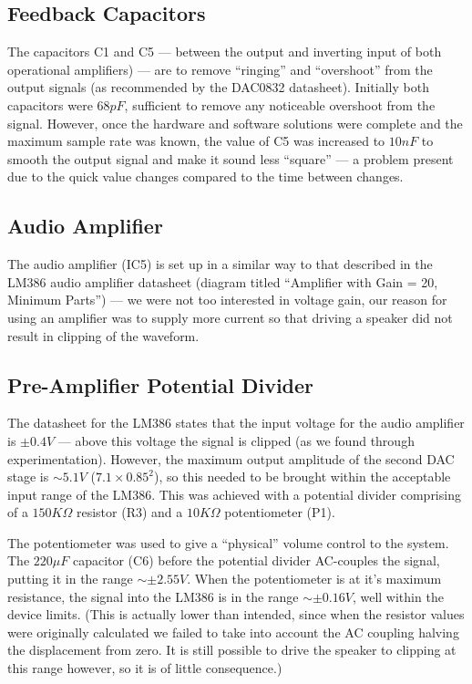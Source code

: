 \subsection{Feedback Capacitors}

The capacitors C1 and C5 --- between the output and inverting input of both operational amplifiers) 
--- are to remove ``ringing'' and ``overshoot'' from the output signals (as recommended by the 
DAC0832 datasheet\cite{dac0832}).  Initially both capacitors were $68pF$, sufficient to remove any 
noticeable overshoot from the signal.  However, once the hardware and software solutions were 
complete and the maximum sample rate was known, the value of C5 was increased to $10nF$ to smooth 
the output signal and make it sound less ``square'' --- a problem present due to the quick value 
changes compared to the time between changes.

\subsection{Audio Amplifier}

The audio amplifier (IC5) is set up in a similar way to that described in the LM386 audio amplifier 
datasheet\cite{lm386} (diagram titled ``Amplifier with Gain = 20, Minimum Parts'') --- we were not 
too interested in voltage gain, our reason for using an amplifier was to supply more current so that 
driving a speaker did not result in clipping of the waveform.

\subsection{Pre-Amplifier Potential Divider}

The datasheet for the LM386\cite{lm386} states that the input voltage for the audio amplifier is 
$\pm0.4V$ --- above this voltage the signal is clipped (as we found through experimentation).  
However, the maximum output amplitude of the second DAC stage is $\sim5.1V$ ($7.1\times0.85^2$), so 
this needed to be brought within the acceptable input range of the LM386.  This was achieved with a 
potential divider comprising of a $150K\Omega$ resistor (R3) and a $10K\Omega$ potentiometer (P1).  

The potentiometer was used to give a ``physical'' volume control to the system.  The $220\mu{}F$ 
capacitor (C6) before the potential divider AC-couples the signal, putting it in the range 
$\sim\pm2.55V$.  When the potentiometer is at it's maximum resistance, the signal into the LM386 is 
in the range $\sim\pm0.16V$, well within the device limits.  (This is actually lower than intended, 
since when the resistor values were originally calculated we failed to take into account the AC 
coupling halving the displacement from zero.  It is still possible to drive the speaker to clipping 
at this range however, so it is of little consequence.)

